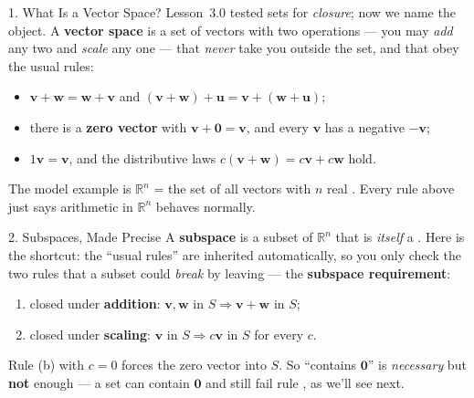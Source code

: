 \documentclass[10pt]{article}
\newcommand{\vv}{\mathbf{v}}
\newcommand{\ww}{\mathbf{w}}
\newcommand{\zero}{\mathbf{0}}
\begin{document}
\begin{notesbox}{1. What Is a Vector Space?}
Lesson~3.0 tested sets for \emph{closure}; now we name the object. A \textbf{vector space} is a set
of vectors with two operations --- you may \emph{add} any two and \emph{scale} any one --- that
\emph{never} take you outside the set, and that obey the usual rules:
\begin{itemize}[leftmargin=1.5em, itemsep=1pt]
  \item $\vv+\ww=\ww+\vv$ and $(\vv+\ww)+\mathbf u=\vv+(\ww+\mathbf u)$;
  \item there is a \textbf{zero vector} with $\vv+\zero=\vv$, and every $\vv$ has a negative $-\vv$;
  \item $1\vv=\vv$, and the distributive laws $c(\vv+\ww)=c\vv+c\ww$ hold.
\end{itemize}
The model example is $\mathbb{R}^n$ = the set of all vectors with $n$ real . Every rule
above just says arithmetic in $\mathbb{R}^n$ behaves normally.
\end{notesbox}

\begin{notesbox}{2. Subspaces, Made Precise}
A \textbf{subspace} is a subset of $\mathbb{R}^n$ that is \emph{itself} a . Here is the
shortcut: the ``usual rules'' are inherited automatically, so you only check the two rules that a
subset could \emph{break} by leaving --- the \textbf{subspace requirement}:
\begin{enumerate}[leftmargin=1.9em, itemsep=3pt]
  \item[\textbf{(a)}] closed under \textbf{addition}: $\vv,\ww$ in $S \Rightarrow \vv+\ww$ in $S$;
  \item[\textbf{(b)}] closed under \textbf{scaling}: $\vv$ in $S \Rightarrow c\vv$ in $S$ for every $c$.
\end{enumerate}
Rule (b) with $c=0$ forces the zero vector into $S$. So ``contains $\zero$'' is \emph{necessary} but
\textbf{not} enough --- a set can contain $\zero$ and still fail rule , as we'll see next.
\end{notesbox}
\end{document}
